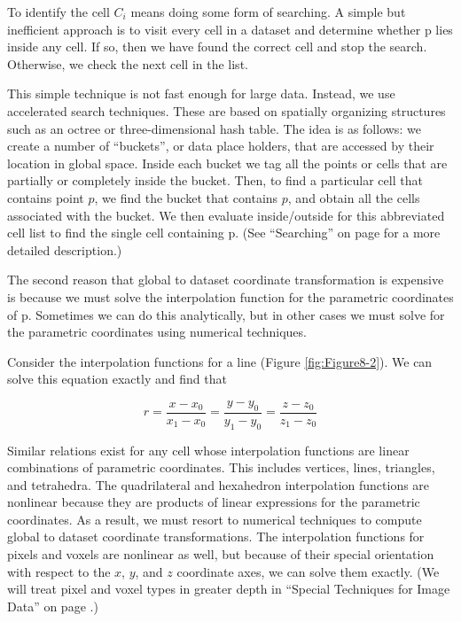 To identify the cell $C_i$ means doing some form of searching. A simple but inefficient approach is to visit every cell in a dataset and determine whether p lies inside any cell. If so, then we have found the correct cell and stop the search. Otherwise, we check the next cell in the list.

This simple technique is not fast enough for large data. Instead, we use accelerated search techniques. These are based on spatially organizing structures such as an octree or three-dimensional hash table. The idea is as follows: we create a number of ``buckets'', or data place holders, that are accessed by their location in global space. Inside each bucket we tag all the points or cells that are partially or completely inside the bucket. Then, to find a particular cell that contains point $p$, we find the bucket that contains $p$, and obtain all the cells associated with the bucket. We then evaluate inside/outside for this abbreviated cell list to find the single cell containing p. (See ``Searching'' on page \pageref{sec:searching} for a more detailed description.)

The second reason that global to dataset coordinate transformation is expensive is because we must solve the interpolation function for the parametric coordinates of p. Sometimes we can do this analytically, but in other cases we must solve for the parametric coordinates using numerical techniques.

Consider the interpolation functions for a line (Figure \ref{fig:Figure8-2}). We can solve this equation exactly and find that

\begin{equation}\label{eq:8.9}
r = \frac{x - x_0}{x_1 - x_0} = \frac{y - y_0}{y_1 - y_0} = \frac{z - z_0}{z_1 - z_0}
\end{equation}

Similar relations exist for any cell whose interpolation functions are linear combinations of parametric coordinates. This includes vertices, lines, triangles, and tetrahedra. The quadrilateral and hexahedron interpolation functions are nonlinear because they are products of linear expressions for the parametric coordinates. As a result, we must resort to numerical techniques to compute global to dataset coordinate transformations. The interpolation functions for pixels and voxels are nonlinear as well, but because of their special orientation with respect to the $x$, $y$, and $z$ coordinate axes, we can solve them exactly. (We will treat pixel and voxel types in greater depth in ``Special Techniques for Image Data'' on page \pageref{sec:special_techniques_for_image_data}.)

